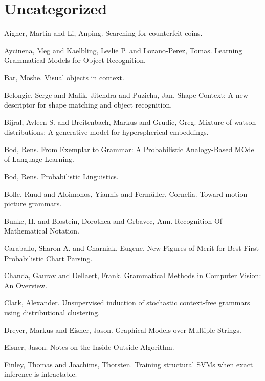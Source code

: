 \documentclass{article}
\begin{document}
\section{Uncategorized}
\bitem
\item Aigner, Martin and Li, Anping. Searching for counterfeit coins. \cite{Aigner1997Searching}
\item Aycinena, Meg and Kaelbling, Leslie P. and Lozano-Perez, Tomas. Learning Grammatical Models for Object Recognition. \cite{Aycinena2008Learning}
\item Bar, Moshe. Visual objects in context. \cite{visual-context}
\item Belongie, Serge and Malik, Jitendra and Puzicha, Jan. Shape Context: A new descriptor for shape matching and object recognition. \cite{Belongie2000Shape}
\item Bijral, Avleen S. and Breitenbach, Markus and Grudic, Greg. Mixture of watson distributions: A generative model for hyperspherical embeddings. \cite{Bijral2007Mixture}
\item Bod, Rens. From Exemplar to Grammar: A Probabilistic Analogy-Based MOdel of Language Learning. \cite{Bod2009From}
\item Bod, Rens. Probabilistic Linguistics. \cite{Bod2003Probabilistic}
\item Bolle, Ruud and Aloimonos, Yiannis and Ferm\"{u}ller, Cornelia. Toward motion picture grammars. \cite{Bolle1997Toward}
\item Bunke, H. and Blostein, Dorothea and Grbavec, Ann. Recognition Of Mathematical Notation. \cite{Bunke1996Recognition}
\item Caraballo, Sharon A. and Charniak, Eugene. New Figures of Merit for Best-First Probabilistic Chart Parsing. \cite{Caraballo1997New}
\item Chanda, Gaurav and Dellaert, Frank. Grammatical Methods in Computer Vision: An Overview. \cite{Chanda2004Grammatical}
\item Clark, Alexander. Unsupervised induction of stochastic context-free grammars using distributional clustering. \cite{Clark2001Unsupervised}
\item Dreyer, Markus and Eisner, Jason. Graphical Models over Multiple Strings. \cite{Dreyer2009Graphical}
\item Eisner, Jason. Notes on the Inside-Outside Algorithm. \cite{EisnerNotes}
\item Finley, Thomas and Joachims, Thorsten. Training structural SVMs when exact inference is intractable. \cite{Finley2008Training}
\end{document}
